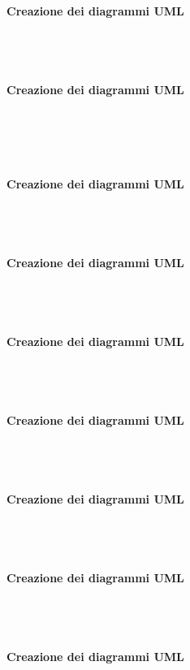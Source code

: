 \paragraph{Creazione dei diagrammi UML} \mbox{}\\ \mbox{}\\

\paragraph{Creazione dei diagrammi UML} \mbox{}\\ \mbox{}\\\\

\paragraph{Creazione dei diagrammi UML} \mbox{}\\ \mbox{}\\

\paragraph{Creazione dei diagrammi UML} \mbox{}\\ \mbox{}\\

\paragraph{Creazione dei diagrammi UML} \mbox{}\\ \mbox{}\\

\paragraph{Creazione dei diagrammi UML} \mbox{}\\ \mbox{}\\

\paragraph{Creazione dei diagrammi UML} \mbox{}\\ \mbox{}\\

\paragraph{Creazione dei diagrammi UML} \mbox{}\\ \mbox{}\\

\paragraph{Creazione dei diagrammi UML} \mbox{}\\ \mbox{}\\

